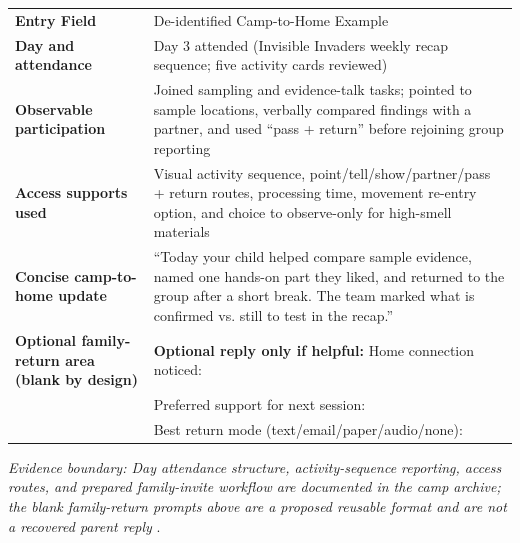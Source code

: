 
\renewcommand{\arraystretch}{1.12}
\setlength{\tabcolsep}{4pt}
\begin{tabularx}{\textwidth}{>{\bfseries\RaggedRight\arraybackslash}p{1.55in} >{\RaggedRight\arraybackslash}X}
\rowcolor{MidTeal}
\color{white}Entry Field & \color{white}De-identified Camp-to-Home Example \\
Day and attendance & Day 3 attended (Invisible Invaders weekly recap sequence; five activity cards reviewed) \\
\rowcolor{SoftGray}
Observable participation & Joined sampling and evidence-talk tasks; pointed to sample locations, verbally compared findings with a partner, and used ``pass + return'' before rejoining group reporting \\
Access supports used & Visual activity sequence, point/tell/show/partner/pass + return routes, processing time, movement re-entry option, and choice to observe-only for high-smell materials \\
\rowcolor{SoftGray}
Concise camp-to-home update & ``Today your child helped compare sample evidence, named one hands-on part they liked, and returned to the group after a short break. The team marked what is confirmed vs. still to test in the recap.'' \\
Optional family-return area (blank by design) & \textbf{Optional reply only if helpful:} Home connection noticed: \underline{\hspace{1.85in}}\\[0.05in]
& Preferred support for next session: \underline{\hspace{1.5in}}\\[0.05in]
& Best return mode (text/email/paper/audio/none): \underline{\hspace{1.25in}} \\
\end{tabularx}

\vspace{0.04in}
\noindent\footnotesize\textit{Evidence boundary: Day attendance structure, activity-sequence reporting, access routes, and prepared family-invite workflow are documented in the camp archive; the blank family-return prompts above are a proposed reusable format and are not a recovered parent reply} \citep{campEvidence2026}.
\normalsize


